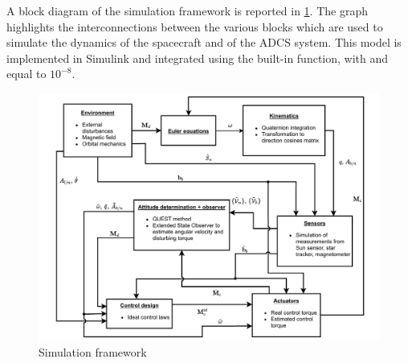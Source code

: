 A block diagram of the simulation framework is reported in \cref{fig:framework}. The graph highlights the interconnections between the various blocks which are used to simulate the dynamics of the spacecraft and of the ADCS system. This model is implemented in Simulink and integrated using the built-in  function, with  and  equal to $10^{-8}$.

\begin{figure}[h!]
    \centering
    \includegraphics[width=\textwidth]{graphics/framework.pdf}
    \caption{Simulation framework}
    \label{fig:framework}
\end{figure}